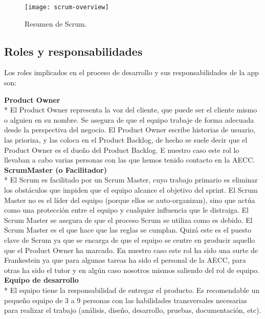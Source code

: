 \documentclass[../pfc.tex]{subfiles}
\begin{document}
		\begin{figure}[h]
			\centering
			\texttt{[image: scrum-overview]}
			\caption{Resumen de Scrum.}
			\label{fig:Resumen de Scrum}
		\end{figure}
	
	\subsection{Roles y responsabilidades}
	Los roles  implicados en el proceso de desarrollo y sus responsabilidades   de la app son:

	\textbf{Product Owner}\\*
	El Product Owner representa la voz del cliente, que puede ser el cliente mismo o alguien en su nombre. Se asegura de que el equipo trabaje de forma adecuada desde la perspectiva del negocio. El Product Owner escribe historias de usuario, las prioriza, y las coloca en el Product Backlog, de hecho se suele decir que el Product Owner es el dueño del Product Backlog. E nuestro caso este rol lo llevaban a cabo varias personas con las que hemos tenido contacto en la AECC.\\
	
	\textbf{ScrumMaster (o Facilitador)}\\*
	El Scrum es facilitado por un Scrum Master, cuyo trabajo primario es eliminar los obstáculos que impiden que el equipo alcance el objetivo del sprint. El Scrum Master no es el líder del equipo (porque ellos se auto-organizan), sino que actúa como una protección entre el equipo y cualquier influencia que le distraiga. El Scrum Master se asegura de que el proceso Scrum se utiliza como es debido. El Scrum Master es el que hace que las reglas se cumplan. Quizá este es el puesto clave de Scrum ya que se encarga de que el equipo se centre en producir aquello que el Product Owner ha marcado. En nuestro caso este rol ha sido una surte de Frankestein ya que para algunas tareas ha sido el personal de la AECC, para otras ha sido el tutor y en algún caso nosotros mismos saliendo del rol de equipo. \\
	
	\textbf{Equipo de desarrollo}\\*
	El equipo tiene la responsabilidad de entregar el producto. Es recomendable un pequeño equipo de 3 a 9 personas con las habilidades transversales necesarias para realizar el trabajo (análisis, diseño, desarrollo, pruebas, documentación, etc).\\
	
\end{document}
